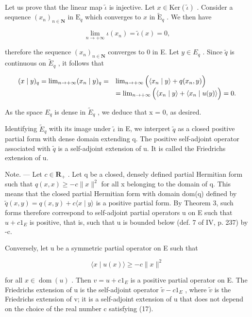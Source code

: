 Let us prove that the linear map \(\widetilde{\iota}\) is injective. Let \(x\in\mathrm{Ker}(\widetilde{\iota})\) . Consider a sequence \((x_{n})_{n\in\mathbf{N}}\) in \(\mathrm{E}_{q}\) which converges to \(x\) in \(\widetilde{\mathrm{E}}_{q}\) . We then have

\[
\lim _ {n \to + \infty} \iota (x _ {n}) = \widetilde {\iota} (x) = 0,
\]

therefore the sequence \((x_{n})_{n\in\mathbf{N}}\) converges to 0 in E. Let \(y\in E_{q}\) . Since \(\widetilde{q}\) is continuous on \(\widetilde{E}_{q}\) , it follows that

\[
\begin{array}{r l} (x \mid y) _ {q} = \lim _ {n \to + \infty} (x _ {n} \mid y) _ {q} = & \lim _ {n \to + \infty} \Big (\langle x _ {n} \mid y \rangle + q (x _ {n}, y) \Big) \\ & = \lim _ {n \to + \infty} \Big (\langle x _ {n} \mid y \rangle + \langle x _ {n} \mid u (y) \rangle \Big) = 0. \end{array}
\]

As the space \(E_{q}\) is dense in \(\widetilde{E}_{q}\) , we deduce that x = 0, as desired.

Identifying \(\widetilde{E}_{q}\) with its image under \(\widetilde{\iota}\) in E, we interpret \(\widetilde{q}\) as a closed positive partial form with dense domain extending q. The positive self-adjoint operator associated with \(\widetilde{q}\) is a self-adjoint extension of u. It is called the Friedrichs extension of u.

Note. --- Let \(c \in \mathbf R_{+}\) . Let q be a closed, densely defined partial Hermitian form such that \(q(x, x) \geqslant -c \|x\|^2\) for all x belonging to the domain of q. This means that the closed partial Hermitian form with domain dom(q) defined by \(\widetilde{q}(x, y) = q(x, y) + c \langle x \mid y \rangle\) is a positive partial form. By Theorem 3, such forms therefore correspond to self-adjoint partial operators u on E such that \(u + c1_{E}\) is positive, that is, such that u is bounded below (def. 7 of IV, p. 237) by -c.

Conversely, let u be a symmetric partial operator on E such that

\[
\langle x \mid u (x) \rangle \geqslant - c \| x \| ^ {2}\tag{17}
\]

for all \(x \in \operatorname{dom}(u)\) . Then \(v = u + c1_{E}\) is a positive partial operator on E. The Friedrichs extension of u is the self-adjoint operator \(\widetilde{v} - c1_{E}\) , where \(\widetilde{v}\) is the Friedrichs extension of v; it is a self-adjoint extension of u that does not depend on the choice of the real number c satisfying (17).
\relax{}
